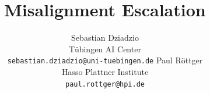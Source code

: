 \documentclass{article}
\title{Misalignment Escalation}
\author{%
  Sebastian Dziadzio \\
  Tübingen AI Center \\
  \texttt{sebastian.dziadzio@uni-tuebingen.de}
  \And
  Paul Röttger \\
  Hasso Plattner Institute \\
  \texttt{paul.rottger@hpi.de}
}
\begin{document}
\maketitle


\begin{abstract}

\end{abstract}













\clearpage
\appendix


\end{document}
